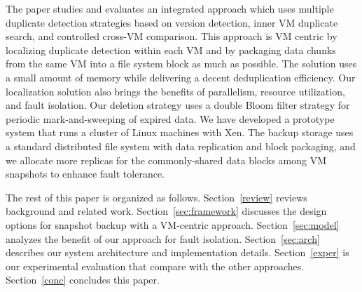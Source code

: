 The paper studies and evaluates  an integrated approach which uses  multiple duplicate detection strategies
based on  version  detection, inner VM duplicate search,
and controlled cross-VM comparison. 
This approach is VM centric by localizing duplicate detection within each VM  
and by packaging data chunks from the same VM into a file system block as much as possible.
The solution uses  a small amount of  memory while delivering a decent deduplication efficiency. 
Our localization solution also brings the benefits of parallelism, resource utilization, and fault isolation.
Our deletion strategy uses a double Bloom filter strategy for periodic mark-and-sweeping of expired data.
We have developed a prototype system that runs a cluster of Linux machines with Xen.
The backup storage uses a standard distributed file system with data replication and block packaging,
and we allocate more  replicas for the commonly-shared  data blocks among VM snapshots to enhance fault tolerance.



The rest of this paper is organized as follows.
Section~\ref{review} reviews background and related work.
Section~\ref{sec:framework}  discusses the  design options for snapshot backup with a VM-centric approach. 
Section~\ref{sec:model}  analyzes the benefit of our approach for fault isolation. 
Section~\ref{sec:arch}  describes our system architecture and implementation details.
Section~\ref{exper} is our experimental evaluation that compare with the other approaches.
Section~\ref{conc}  concludes this paper.


